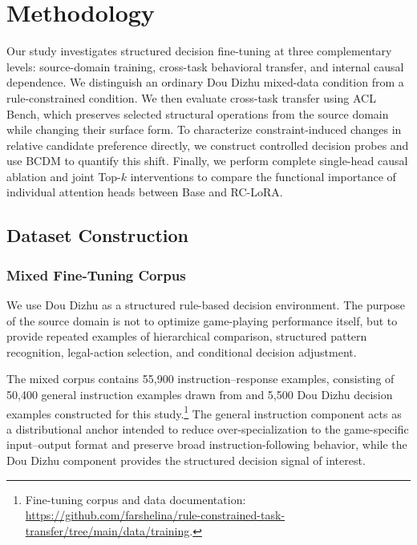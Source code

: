 \section{Methodology}
\label{sec:method}

Our study investigates structured decision fine-tuning at three complementary levels: source-domain training, cross-task behavioral transfer, and internal causal dependence. We distinguish an ordinary Dou Dizhu mixed-data condition from a rule-constrained condition. We then evaluate cross-task transfer using ACL Bench, which preserves selected structural operations from the source domain while changing their surface form. To characterize constraint-induced changes in relative candidate preference directly, we construct controlled decision probes and use BCDM to quantify this shift. Finally, we perform complete single-head causal ablation and joint Top-$k$ interventions to compare the functional importance of individual attention heads between Base and RC-LoRA.

\subsection{Dataset Construction}
\label{sec:dataset_construction}

\subsubsection{Mixed Fine-Tuning Corpus}

We use Dou Dizhu as a structured rule-based decision environment. The purpose of the source domain is not to optimize game-playing performance itself, but to provide repeated examples of hierarchical comparison, structured pattern recognition, legal-action selection, and conditional decision adjustment.

The mixed corpus contains 55,900 instruction--response examples, consisting of 50,400 general instruction examples drawn from  \cite{cui2023chinese} and 5,500 Dou Dizhu decision examples constructed for this study.\footnote{Fine-tuning corpus and data documentation: \url{https://github.com/farshelina/rule-constrained-task-transfer/tree/main/data/training}.} The general instruction component acts as a distributional anchor intended to reduce over-specialization to the game-specific input--output format and preserve broad instruction-following behavior, while the Dou Dizhu component provides the structured decision signal of interest.

